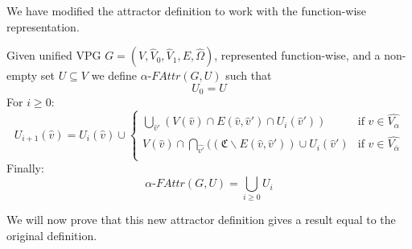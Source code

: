 We have modified the attractor definition to work with the function-wise representation.
\begin{definition}
		\label{def_Uattr}Given unified VPG $G = (V, \hat{V}_0,\hat{V}_1,E,\hat{\Omega})$, represented function-wise, and a non-empty set $U \subseteq V$ we define $\alpha\textit{-FAttr}(G,U)$ such that
	\[U_0 = U \]
	For $i \geq 0$:
	\[
	U_{i+1}(\hat{v}) = U_i(\hat{v}) \cup \begin{cases}
\bigcup_{\hat{v}'} (V(\hat{v}) \cap E(\hat{v},\hat{v}') \cap U_i(\hat{v}')) & \text{if } \hat{v} \in \hat{V_{\alpha}}\\
V(\hat{v}) \cap \bigcap_{\hat{v'}}((\mathfrak{C} \backslash E(\hat{v},\hat{v}')) \cup U_i(\hat{v}') & \text{if }\hat{v} \in  \hat{V_{\overline{\alpha}}} \\
	\end{cases}
	\]
	Finally:
	\[\alpha\textit{-FAttr}(G,U) = \bigcup_{i \geq 0} U_i \]
\end{definition}
We will now prove that this new attractor definition gives a result equal to the original definition.
